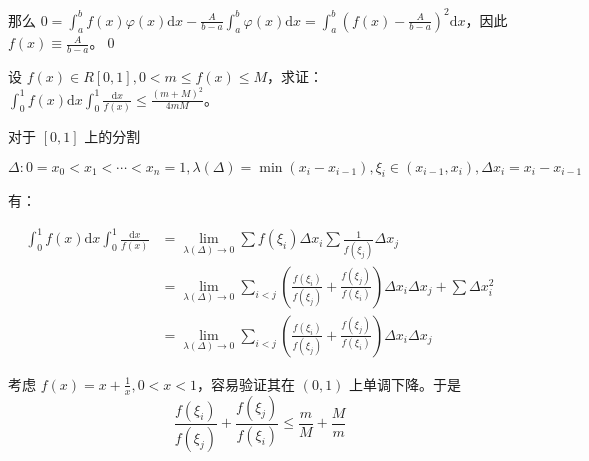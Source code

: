 那么 $\displaystyle 0=\int _{a}^{b} f( x) \varphi ( x)\mathrm{d} x-\frac{A}{b-a}\int _{a}^{b} \varphi ( x)\mathrm{d} x=\int _{a}^{b}\left( f( x) -\frac{A}{b-a}\right)^{2}\mathrm{d} x$，因此 $\displaystyle f( x) \equiv \frac{A}{b-a}$。\qed 





\begin{ques}
设 $\displaystyle f( x) \in R[ 0,1] ,0< m\leqslant f( x) \leqslant M$，求证：$\displaystyle \int _{0}^{1} f( x)\mathrm{d} x\int _{0}^{1}\frac{\mathrm{d} x}{f( x)} \leqslant \frac{( m+M)^{2}}{4mM}$。
\end{ques}



对于 $\displaystyle [ 0,1]$ 上的分割


\begin{equation*}
	\Delta :0=x_{0} < x_{1} < \cdots < x_{n} =1,\lambda ( \Delta ) =\min( x_{i} -x_{i-1}) ,\xi _{i} \in ( x_{i-1} ,x_{i}) ,\Delta x_{i} =x_{i} -x_{i-1}
\end{equation*}


有：


\begin{equation*}
	\begin{aligned}
		\int _{0}^{1} f( x)\mathrm{d} x\int _{0}^{1}\frac{\mathrm{d} x}{f( x)} & =\lim _{\lambda ( \Delta )\rightarrow 0}\sum f( \xi _{i}) \Delta x_{i}\sum \frac{1}{f( \xi _{j})} \Delta x_{j}\\
		& =\lim _{\lambda ( \Delta )\rightarrow 0}\sum _{i< j}\left(\frac{f( \xi _{i})}{f( \xi _{j})} +\frac{f( \xi _{j})}{f( \xi _{i})}\right) \Delta x_{i} \Delta x_{j} +\sum \Delta x_{i}^{2}\\
		& =\lim _{\lambda ( \Delta )\rightarrow 0}\sum _{i< j}\left(\frac{f( \xi _{i})}{f( \xi _{j})} +\frac{f( \xi _{j})}{f( \xi _{i})}\right) \Delta x_{i} \Delta x_{j}
	\end{aligned}
\end{equation*}


考虑 $\displaystyle f( x) =x+\frac{1}{x} ,0< x< 1$，容易验证其在 $\displaystyle ( 0,1)$ 上单调下降。于是
\begin{equation*}
	\frac{f( \xi _{i})}{f( \xi _{j})} +\frac{f( \xi _{j})}{f( \xi _{i})} \leqslant \frac{m}{M} +\frac{M}{m}
\end{equation*}



